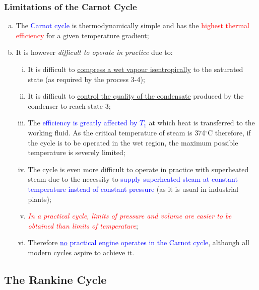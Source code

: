 \documentclass[10pt,compress]{beamer}
\newcommand{\red}{\textcolor{red}}
\newcommand{\blue}{\textcolor{blue}}
\begin{document}
\begin{frame}
 \frametitle{Limitations of the Carnot Cycle}
 \begin{enumerate}[(a)]
  \item <1-> The \blue{Carnot cycle} is thermodynamically simple and has the \red{highest thermal efficiency} for a given temperature gradient;
  \item <2-> It is however {\it difficult to operate in practice} due to:
  \begin{enumerate}[(i)] %
   \item <3-> It is difficult to \underline{compress a wet vapour isentropically} to the saturated state (as required by the process 3-4);
   \item <4-> It is difficult to \underline{control the quality of the condensate} produced by the condenser to reach state 3;
   \item <5-> The \blue{efficiency is greatly affected by $T_{1}$} at which heat is transferred to the working fluid. As the critical temperature of steam is 374$^{\circ}$C therefore, if the cycle is to be operated in the wet region, the maximum possible temperature is severely limited;
   \item <6-> The cycle is even more difficult to operate in practice with superheated steam due to the necessity to \blue{supply superheated steam at constant temperature instead of constant pressure} (as it is usual in industrial plants);
   \item <7-> \red{\it In a practical cycle, limits of pressure and volume are easier to be obtained than limits of temperature}; 
   \item <8-> Therefore \blue{\underline{no} practical engine operates in the Carnot cycle}, although all modern cycles aspire to achieve it.
  \end{enumerate}
 \end{enumerate}
 \normalsize
\end{frame}

\subsection{The Rankine Cycle}
\end{document}
